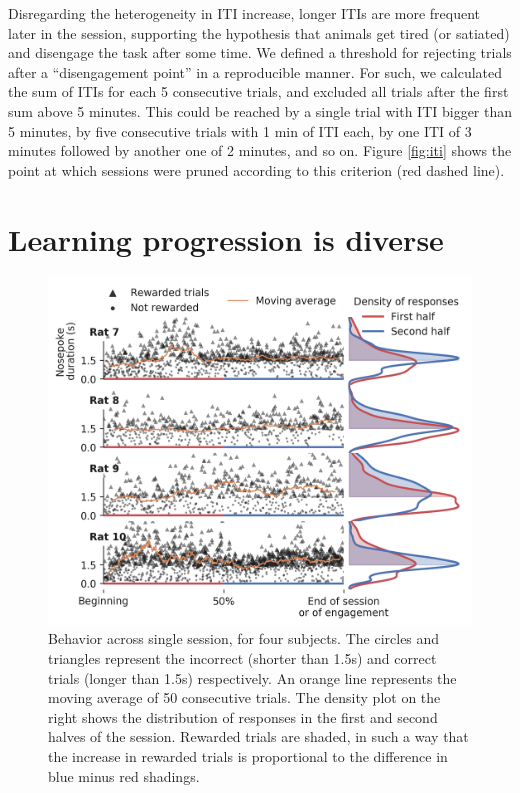     Disregarding the heterogeneity in ITI increase, longer ITIs are more frequent later in the session, supporting the hypothesis that animals get tired (or satiated) and disengage the task after some time. We defined a threshold for rejecting trials after a ``disengagement point'' in a reproducible manner. For such, we calculated the sum of ITIs for each 5 consecutive trials, and excluded all trials after the first sum above 5 minutes. This could be reached by a single trial with ITI bigger than 5 minutes, by five consecutive trials with 1 min of ITI each, by one ITI of 3 minutes followed by another one of 2 minutes, and so on. Figure \ref{fig:iti} shows the point at which sessions were pruned according to this criterion (red dashed line).
    
\section{Learning progression is diverse}
    \begin{figure}[ht!]
        \centering
        \includegraphics[width=\textwidth]{figures/behavior_group_1_with_avg_bold.png}
        \caption[Behavior across single session]{Behavior across single session, for four subjects. The circles and triangles represent the incorrect (shorter than 1.5s) and correct trials (longer than 1.5s) respectively. An orange line represents the moving average of 50 consecutive trials. The density plot on the right shows the distribution of responses in the first and second halves of the session. Rewarded trials are shaded, in such a way that the increase in rewarded trials is proportional to the difference in blue minus red shadings.}
        \label{fig:behavior}
    \end{figure} 
    
